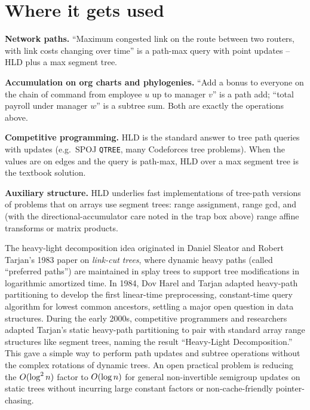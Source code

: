\section{Where it gets used}
\label{ch19:apps}

\begin{applicationbox}
\textbf{Network paths.} ``Maximum congested link on the route between two routers, with link costs
changing over time'' is a path-max query with point updates -- HLD plus a max segment tree.

\textbf{Accumulation on org charts and phylogenies.} ``Add a bonus to everyone on the chain of command
from employee $u$ up to manager $v$'' is a path add; ``total payroll under manager $w$'' is a subtree
sum. Both are exactly the operations above.

\textbf{Competitive programming.} HLD is the standard answer to tree path queries with updates
(e.g.\ SPOJ \texttt{QTREE}, many Codeforces tree problems). When the values are on edges and the query
is path-max, HLD over a max segment tree is the textbook solution.

\textbf{Auxiliary structure.} HLD underlies fast implementations of tree-path versions of problems
that on arrays use segment trees: range assignment, range gcd, and (with the directional-accumulator
care noted in the trap box above) range affine transforms or matrix products.
\end{applicationbox}

\begin{historybox}
The heavy-light decomposition idea originated in Daniel Sleator and Robert Tarjan's 1983 paper on \emph{link-cut trees}, where dynamic heavy paths (called ``preferred paths'') are maintained in splay trees to support tree modifications in logarithmic amortized time. In 1984, Dov Harel and Tarjan adapted heavy-path partitioning to develop the first linear-time preprocessing, constant-time query algorithm for lowest common ancestors, settling a major open question in data structures. During the early 2000s, competitive programmers and researchers adapted Tarjan's static heavy-path partitioning to pair with standard array range structures like segment trees, naming the result ``Heavy-Light Decomposition.'' This gave a simple way to perform path updates and subtree operations without the complex rotations of dynamic trees. An open practical problem is reducing the $O(\log^2 n)$ factor to $O(\log n)$ for general non-invertible semigroup updates on static trees without incurring large constant factors or non-cache-friendly pointer-chasing.
\end{historybox}

